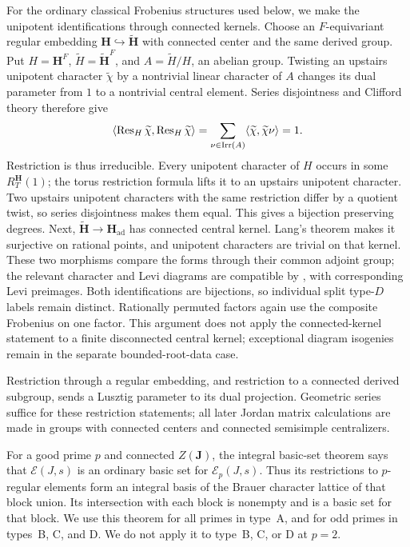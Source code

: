 For the ordinary classical Frobenius structures used below, we
make the unipotent identifications through connected kernels.
Choose an $F$-equivariant regular embedding
$\mathbf H\hookrightarrow\widetilde{\mathbf H}$ with connected
center and the same derived group.  Put
$H=\mathbf H^F$, $\widetilde H=\widetilde{\mathbf H}^F$, and
$A=\widetilde H/H$, an abelian group.  Twisting an upstairs
unipotent character $\widetilde\chi$ by a nontrivial linear
character of $A$ changes its dual parameter from $1$ to a
nontrivial central element.  Series disjointness and Clifford
theory therefore give
\[
 \langle\operatorname{Res}_H\widetilde\chi,\operatorname{Res}_H\widetilde\chi\rangle
 =\sum_{\nu\in\operatorname{Irr}(A)}
       \langle\widetilde\chi,\widetilde\chi\nu\rangle=1.
\]
Restriction is thus irreducible.  Every unipotent character of
$H$ occurs in some $R_T^{\mathbf H}(1)$; the torus restriction
formula lifts it to an upstairs unipotent character.  Two
upstairs unipotent characters with the same restriction differ
by a quotient twist, so series disjointness makes them equal.
This gives a bijection preserving degrees.  Next,
$\widetilde{\mathbf H}\to\mathbf H_{\mathrm{ad}}$ has connected
central kernel.  Lang's theorem makes it surjective on rational
points, and unipotent characters are trivial on that kernel.
These two morphisms compare the forms through their common
adjoint group; the relevant character and Levi diagrams are
compatible by \cite[Proposition~2.5(i), Theorem~9.1 and
Corollary~9.2]{DigneMichel1990}, with corresponding Levi preimages.
Both identifications are bijections, so individual split type-$D$
labels remain distinct.  Rationally permuted factors again use
the composite Frobenius on one factor.  This argument does not
apply the connected-kernel statement to a finite disconnected
central kernel; exceptional diagram isogenies remain in the
separate bounded-root-data case.

Restriction through a regular embedding, and restriction to a connected derived
subgroup, sends a Lusztig parameter to its dual projection.  Geometric
series suffice for these restriction statements; all later Jordan
matrix calculations are made in groups with connected centers and
connected semisimple centralizers.

For a good prime \(p\) and connected \(Z(\mathbf J)\), the integral
basic-set theorem \cite{GeckHiss} says that
\(\mathcal E(J,s)\) is an ordinary basic set for
\(\mathcal E_p(J,s)\).  Thus its restrictions to \(p\)-regular elements
form an integral basis of the Brauer character lattice of that block
union.  Its intersection with each block is nonempty and is a basic
set for that block.  We use this theorem for all primes in type~A,
and for odd primes in types~B, C, and D.  We do not apply it to type~B,
C, or D at \(p=2\).

